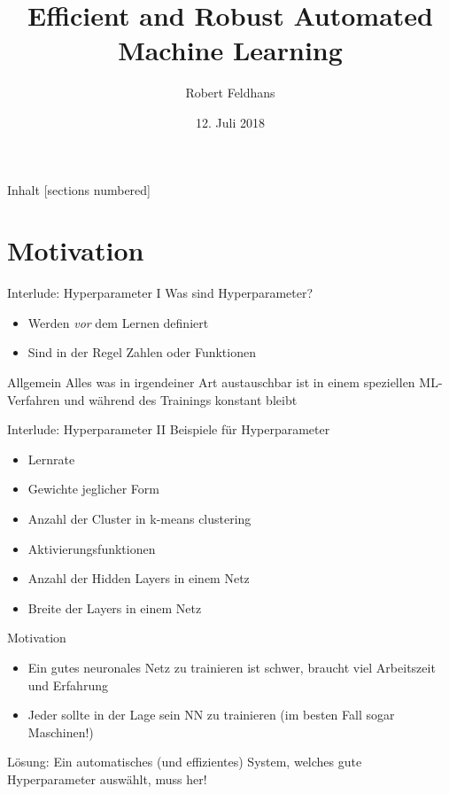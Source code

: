 \documentclass{beamer}
\title{Efficient and Robust Automated Machine Learning}
\date{12. Juli 2018}
\author{Robert Feldhans}
\institute{Seminar Musterklassifikation}
\begin{document}
	\maketitle
	
	\begin{frame}{Inhalt}
		[sections numbered]
		\tableofcontents[hideallsubsections]
	\end{frame}
	
	\section{Motivation}%
	
	\begin{frame}{Interlude: Hyperparameter I}
		Was sind Hyperparameter?
		\begin{itemize}
			\item Werden \emph{vor} dem Lernen definiert
			\item Sind in der Regel Zahlen oder Funktionen
		\end{itemize}
		\pause
		\begin{alertblock}{Allgemein}
			Alles was in irgendeiner Art austauschbar ist in einem speziellen ML-Verfahren und während des Trainings konstant bleibt
		\end{alertblock}
	\end{frame}
	
	\begin{frame}{Interlude: Hyperparameter II}
		Beispiele für Hyperparameter
		\begin{itemize}
			\item Lernrate
			\item Gewichte jeglicher Form
			\item Anzahl der Cluster in k-means clustering
			\item Aktivierungsfunktionen
			\item Anzahl der Hidden Layers in einem Netz
			\item Breite der Layers in einem Netz
		\end{itemize}
	\end{frame}
	
	\begin{frame}{Motivation}
		\begin{itemize}
			\item Ein gutes neuronales Netz zu trainieren ist schwer, braucht viel Arbeitszeit und Erfahrung
			\item Jeder sollte in der Lage sein NN zu trainieren (im besten Fall sogar Maschinen!)
		\end{itemize}
		\pause
		\alert{Lösung: Ein automatisches (und effizientes) System, welches gute Hyperparameter auswählt, muss her!}
	\end{frame}
	
\end{document}
